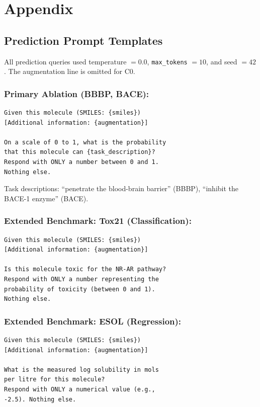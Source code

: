 \section{Appendix}
\label{sec:appendix}

\subsection{Prediction Prompt Templates}
All prediction queries used temperature $= 0.0$, \texttt{max\_tokens} $= 10$, and seed $= 42$. The augmentation line is omitted for C0.

\subsubsection*{Primary Ablation (BBBP, BACE):}
\begin{verbatim}
Given this molecule (SMILES: {smiles})
[Additional information: {augmentation}]

On a scale of 0 to 1, what is the probability
that this molecule can {task_description}?
Respond with ONLY a number between 0 and 1.
Nothing else.
\end{verbatim}
Task descriptions: ``penetrate the blood-brain barrier'' (BBBP), ``inhibit the BACE-1 enzyme'' (BACE).

\subsubsection*{Extended Benchmark: Tox21 (Classification):}
\begin{verbatim}
Given this molecule (SMILES: {smiles})
[Additional information: {augmentation}]

Is this molecule toxic for the NR-AR pathway?
Respond with ONLY a number representing the
probability of toxicity (between 0 and 1).
Nothing else.
\end{verbatim}

\subsubsection*{Extended Benchmark: ESOL (Regression):}
\begin{verbatim}
Given this molecule (SMILES: {smiles})
[Additional information: {augmentation}]

What is the measured log solubility in mols
per litre for this molecule?
Respond with ONLY a numerical value (e.g.,
-2.5). Nothing else.
\end{verbatim}

